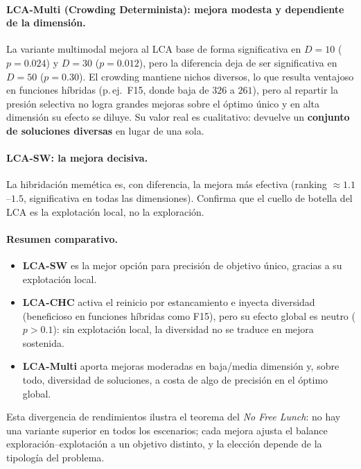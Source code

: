 \paragraph{LCA-Multi (Crowding Determinista): mejora modesta y dependiente de la dimensión.}
La variante multimodal mejora al LCA base de forma significativa en $D=10$ ($p=0.024$) y
$D=30$ ($p=0.012$), pero la diferencia deja de ser significativa en $D=50$ ($p=0.30$). El
crowding mantiene nichos diversos, lo que resulta ventajoso en funciones híbridas (p.\,ej.\
F15, donde baja de $326$ a $261$), pero al repartir la presión selectiva no logra grandes
mejoras sobre el óptimo único y en alta dimensión su efecto se diluye. Su valor real es
cualitativo: devuelve un \textbf{conjunto de soluciones diversas} en lugar de una sola.

\paragraph{LCA-SW: la mejora decisiva.}
La hibridación memética es, con diferencia, la mejora más efectiva (ranking $\approx 1.1$--$1.5$,
significativa en todas las dimensiones). Confirma que el cuello de botella del LCA es la
explotación local, no la exploración.

\paragraph{Resumen comparativo.}
\begin{itemize}
  \item \textbf{LCA-SW} es la mejor opción para precisión de objetivo único, gracias a su
        explotación local.
  \item \textbf{LCA-CHC} activa el reinicio por estancamiento e inyecta diversidad
        (beneficioso en funciones híbridas como F15), pero su efecto global es neutro
        ($p>0.1$): sin explotación local, la diversidad no se traduce en mejora sostenida.
  \item \textbf{LCA-Multi} aporta mejoras moderadas en baja/media dimensión y, sobre todo,
        diversidad de soluciones, a costa de algo de precisión en el óptimo global.
\end{itemize}

Esta divergencia de rendimientos ilustra el teorema del \emph{No Free Lunch}: no hay una
variante superior en todos los escenarios; cada mejora ajusta el balance
exploración--explotación a un objetivo distinto, y la elección depende de la tipología del
problema.
